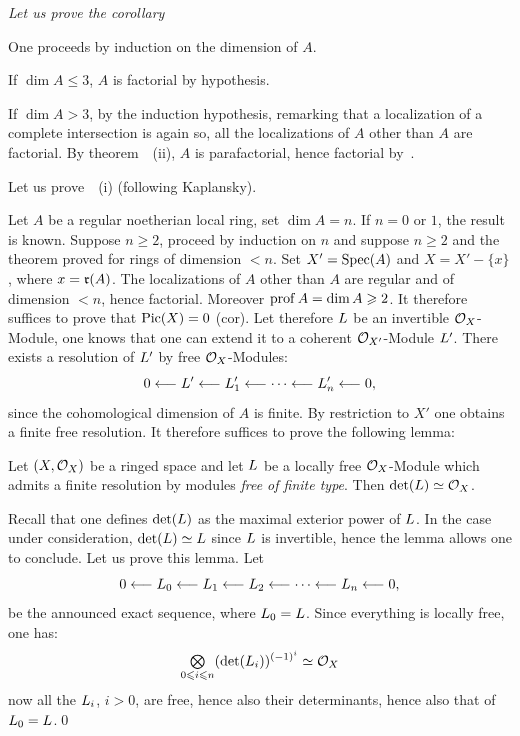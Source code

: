 \emph{Let us prove the corollary}

One proceeds by induction on the dimension of $A$.

If $\dim A\leq 3$, $A$ is factorial by hypothesis.

If $\dim A>3$, by the induction hypothesis, remarking that a localization of a complete intersection is again so, all the localizations of $A$ other than $A$ are factorial. By theorem~~(ii), $A$ is parafactorial, hence factorial by~.

Let us prove~~(i) (following Kaplansky).

Let $A$ be a regular noetherian local ring, set $\dim A=n$. If $n=0$ or $1$, the result is known. Suppose $n\geq 2$, proceed by induction on $n$ and suppose $n\geq 2$ and the theorem proved for rings of dimension $<n$. Set $X'=\operatorname{Spec}(A)$ and $X=X'-\{x\}$, where $x=\mathfrak{r}(A)$. The localizations of $A$ other than $A$ are regular and of dimension $<n$, hence factorial. Moreover $\operatorname{prof} A = \dim A\geqslant 2$. It therefore suffices to prove that $\operatorname{Pic}(X)=0$ (cor\ptbl{}). Let therefore ${L}$ be an invertible $\mathcal{O}_X$-Module, one knows that one can extend it to a coherent ${\mathcal O}_{X'}$-Module ${L}'$. There exists a resolution of ${L}'$ by free $\mathcal{O}_X$-Modules:
\[
0\from {\Lcal}'\from {\Lcal}'_1\from\cdots\from{\Lcal}'_n\from 0{\quoi},
\]
since the cohomological dimension of $A$ is finite. By restriction to $X'$ one obtains a finite free resolution. It therefore suffices to prove the following lemma:

\begin{lemma} \label{XI.3.15} Let $(X, \mathcal{O}_X)$ be a ringed space and let ${L}$ be a locally free $\mathcal{O}_X$-Module which admits a finite resolution by modules \emph{free of finite type}. Then $\det({L}) \simeq \mathcal{O}_X$.
\end{lemma}

Recall that one defines $\det({L})$ as the maximal exterior power of ${L}$. In the case under consideration, $\det({L}) \simeq{L}$ since ${L}$ is invertible, hence the lemma allows one to conclude. Let us prove this lemma. Let
\[
0\from {\Lcal}_0\from {\Lcal}_1\from {\Lcal}_2\from\cdots\from{\Lcal}_n\from 0{\quoi},
\]
be the announced exact sequence, where ${L}_0={L}$. Since everything is locally free, one has:
\[
\mathop{\textstyle\bigotimes}\limits_{0\leqslant i\leqslant n}(\det({L}_i))^{(-1)^i} \simeq \mathcal{O}_X
\]
now all the ${L}_i$, $i>0$, are free, hence also their determinants, hence also that of ${L}_0 = {L}$.\qed


